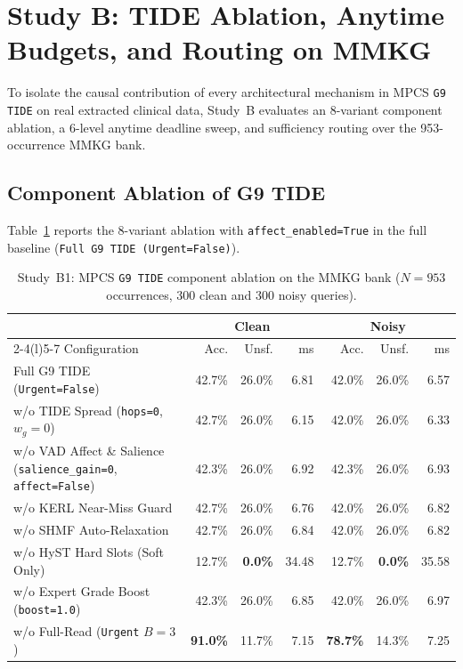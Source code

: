 \documentclass[12pt,a4paper,oneside]{report}
\newcommand{\code}[1]{\texttt{\small #1}}
\begin{document}
\section{Study B: TIDE Ablation, Anytime Budgets, and Routing on MMKG}\label{sec:study-b}
To isolate the causal contribution of every architectural mechanism in MPCS \code{G9 TIDE} on real extracted clinical data, Study~B evaluates an 8-variant component ablation, a 6-level anytime deadline sweep, and sufficiency routing over the 953-occurrence MMKG bank.

\subsection{Component Ablation of G9 TIDE}
Table~\ref{tab:mmkg-tide-ablation} reports the 8-variant ablation with \code{affect\_enabled=True} in the full baseline (\code{Full G9 TIDE (Urgent=False)}).

\begin{table}[H]
\centering
\caption{Study~B1: MPCS \code{G9 TIDE} component ablation on the MMKG bank ($N=953$ occurrences, 300 clean and 300 noisy queries).}
\label{tab:mmkg-tide-ablation}
\scriptsize
\setlength{\tabcolsep}{3.5pt}
\begin{tabular}{@{}l rrr rrr@{}}
\toprule
& \multicolumn{3}{c}{Clean} & \multicolumn{3}{c}{Noisy}\\
\cmidrule(lr){2-4}\cmidrule(l){5-7}
Configuration & Acc. & Unsf. & ms & Acc. & Unsf. & ms\\
\midrule
Full G9 TIDE (\code{Urgent=False}) & 42.7\% & 26.0\% & 6.81 & 42.0\% & 26.0\% & 6.57\\
w/o TIDE Spread (\code{hops=0}, $w_g=0$) & 42.7\% & 26.0\% & 6.15 & 42.0\% & 26.0\% & 6.33\\
w/o VAD Affect \& Salience (\code{salience\_gain=0}, \code{affect=False}) & 42.3\% & 26.0\% & 6.92 & 42.3\% & 26.0\% & 6.93\\
w/o KERL Near-Miss Guard & 42.7\% & 26.0\% & 6.76 & 42.0\% & 26.0\% & 6.82\\
w/o SHMF Auto-Relaxation & 42.7\% & 26.0\% & 6.84 & 42.0\% & 26.0\% & 6.82\\
w/o HyST Hard Slots (Soft Only) & 12.7\% & \textbf{0.0\%} & 34.48 & 12.7\% & \textbf{0.0\%} & 35.58\\
w/o Expert Grade Boost (\code{boost=1.0}) & 42.3\% & 26.0\% & 6.85 & 42.0\% & 26.0\% & 6.97\\
w/o Full-Read (\code{Urgent} $B=3$) & \textbf{91.0\%} & 11.7\% & 7.15 & \textbf{78.7\%} & 14.3\% & 7.25\\
\bottomrule
\end{tabular}
\end{table}
\end{document}
